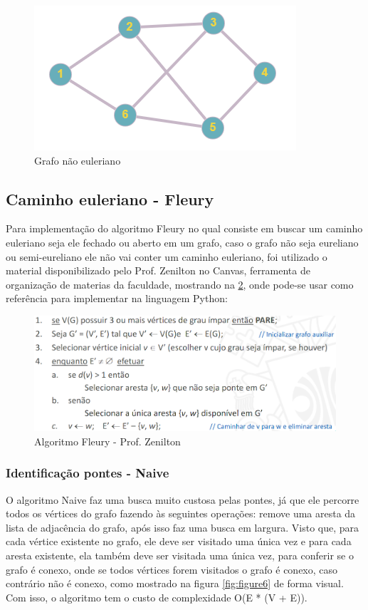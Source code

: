 \begin{figure}[ht]
    \centering
    \includegraphics[width=.2\textwidth]{figuras/not_eurelian.png}
    \caption{Grafo não euleriano}
    \label{fig:figure4}
\end{figure}

\subsection{\esp Caminho euleriano - Fleury}
Para implementação do algoritmo Fleury no qual consiste em buscar um caminho euleriano seja ele fechado ou aberto em um grafo, caso o grafo não seja eureliano ou semi-eureliano ele não vai conter um caminho euleriano, foi utilizado o material disponibilizado pelo Prof. Zenilton no Canvas, ferramenta de organização de materias da faculdade, mostrando na \ref{fig:figure5}, onde pode-se usar como referência para implementar na linguagem Python:

\begin{figure}[ht]
    \centering
    \includegraphics[width=.9\textwidth]{figuras/fleury.png}
    \caption{Algoritmo Fleury - Prof. Zenilton}
    \label{fig:figure5}
\end{figure}

\subsubsection{\esp Identificação pontes - Naive}
O algoritmo Naive faz uma busca muito custosa pelas pontes, já que ele percorre todos os vértices do grafo fazendo às seguintes operações: remove uma aresta da lista de adjacência do grafo, após isso faz uma busca em largura. Visto que, para cada vértice existente no grafo, ele deve ser visitado uma única vez e para cada aresta existente, ela também deve ser visitada uma única vez, para conferir se o grafo é conexo, onde se todos vértices forem visitados o grafo é conexo, caso contrário não é conexo, como mostrado na figura \ref{fig:figure6} de forma visual. Com isso, o algoritmo tem o custo de complexidade O(E * (V + E)).

